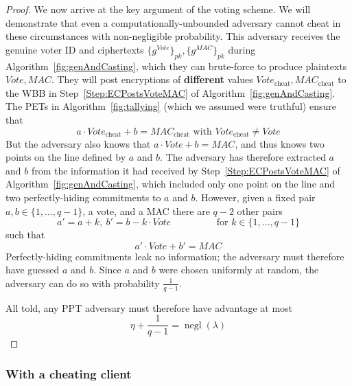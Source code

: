 \documentclass[12pt,a4paper]{article}
\DeclareMathOperator{\negl}{\text{negl}}
\theoremstyle{definition}
\newcommand{\Vote}{\mathit{Vote}}
\newcommand{\Mac}{\mathit{MAC}}
\begin{document}
\begin{proof}
    We now arrive at the key argument of the voting scheme. We will demonstrate that even a computationally-unbounded adversary cannot cheat in these circumstances with non-negligible probability. This adversary receives the genuine voter ID and ciphertexts $\{g^\Vote\}_{pk}, \{g^\Mac\}_{pk}$ during Algorithm~\ref{fig:genAndCasting}, which they can brute-force to produce plaintexts $\Vote, \Mac$. They will post encryptions of \textbf{different} values $\Vote_\text{cheat}, \Mac_\text{cheat}$ to the WBB in Step~\ref{Step:ECPostsVoteMAC} of Algorithm~\ref{fig:genAndCasting}. The PETs in Algorithm~\ref{fig:tallying} (which we assumed were truthful) ensure that
    $$a\cdot\Vote_\text{cheat}+b=\Mac_\text{cheat}\text{ with }\Vote_\text{cheat}\neq\Vote$$
    But the adversary also knows that $a\cdot\Vote+b=\Mac$, and thus knows two points on the line defined by $a$ and $b$. The adversary has therefore extracted $a$ and $b$ from the information it had received by Step~\ref{Step:ECPostsVoteMAC} of Algorithm~\ref{fig:genAndCasting}, which included only one point on the line and two perfectly-hiding commitments to $a$ and $b$. However, given a fixed pair $a,b\in\{1,\ldots,q-1\}$, a vote, and a MAC there are $q-2$ other pairs
    $$a'=a+k,\ b'=b-k\cdot Vote \hspace{2cm} \text{for }k\in\{1,\ldots,q-1\}$$
    such that
    $$a'\cdot\Vote+b'=\Mac$$
    Perfectly-hiding commitments leak no information; the adversary must therefore have guessed $a$ and $b$. Since $a$ and $b$ were chosen uniformly at random, the adversary can do so with probability $\frac{1}{q-1}$.

    All told, any PPT adversary must therefore have advantage at most
    $$\eta+\frac{1}{q-1}=\negl(\lambda)$$
\end{proof}
\newpage
\subsubsection{With a cheating client}
\end{document}

